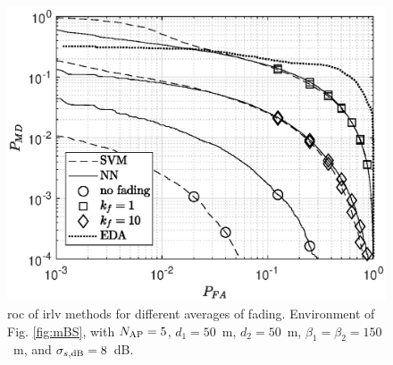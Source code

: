 \documentclass[draftcls,journal,onecolumn]{IEEEtran}
\begin{document}

\begin{figure}[t]
    \centering
    \includegraphics[width=\columnwidth]{res_fading_5BS_2Class.eps}
    \caption{\ac{roc} of \ac{irlv} methods for different averages of fading. Environment of Fig. \ref{fig:mBS}, with  $N_{\rm AP}=5$, $d_1 = 50 $~m, $d_2 = 50$~m, $\beta_1 = \beta_2 = 150$~m, and $\sigma_{s,{\rm dB}} = 8$~dB.}
    \label{fig:kf10-5}
\end{figure}


\end{document}
